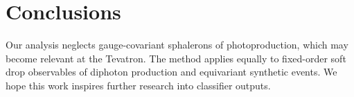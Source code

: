 \section{Conclusions}\label{sec:conclusions}

Our analysis neglects gauge-covariant sphalerons of photoproduction,
which may become relevant at the Tevatron. The method applies equally to
fixed-order soft drop observables of diphoton production and equivariant
synthetic events. We hope this work inspires further research into
classifier outputs.

